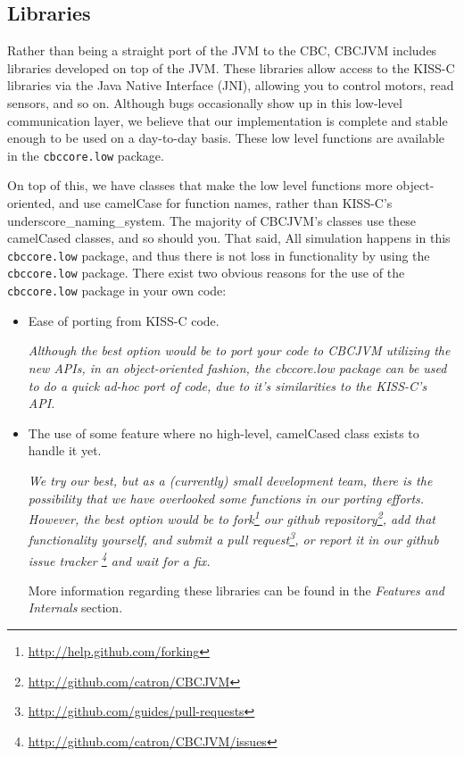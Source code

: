 \documentclass[12pt,letterpaper]{article}
\newcommand{\urlfootnote}[1]{\footnote{\url{#1}}}
\begin{document}
\subsection{Libraries}

Rather than being a straight port of the JVM to the CBC, CBCJVM includes libraries developed on top of the JVM. These libraries allow access to the KISS-C libraries via the Java Native Interface (JNI), allowing you to control motors, read sensors, and so on. Although bugs occasionally show up in this low-level communication layer, we believe that our implementation is complete and stable enough to be used on a day-to-day basis. These low level functions are available in the \texttt{cbccore.low} package.

On top of this, we have classes that make the low level functions more object-oriented, and use camelCase for function names, rather than KISS-C's underscore{\_}naming{\_}system. The majority of CBCJVM's classes use these camelCased classes, and so should you. That said, All simulation happens in this \texttt{cbccore.low} package, and thus there is not loss in functionality by using the \texttt{cbccore.low} package. There exist two obvious reasons for the use of the \texttt{cbccore.low} package in your own code:
\begin{itemize}
\item Ease of porting from KISS-C code.

\textit{Although the best option would be to port your code to CBCJVM utilizing the new APIs, in an object-oriented fashion, the \textit{cbccore.low} package can be used to do a quick ad-hoc port of code, due to it's similarities to the KISS-C's API.}

\item The use of some feature where no high-level, camelCased class exists to handle it yet.

\textit{We try our best, but as a (currently) small development team, there is the possibility that we have overlooked some functions in our porting efforts. However, the best option would be to fork\urlfootnote{http://help.github.com/forking} our github repository\urlfootnote{http://github.com/catron/CBCJVM}, add that functionality yourself, and submit a pull request\urlfootnote{http://github.com/guides/pull-requests}, or report it in our github issue tracker \urlfootnote{http://github.com/catron/CBCJVM/issues} and wait for a fix.}

More information regarding these libraries can be found in the \textit{Features and Internals} section.
\end{itemize}
\end{document}
